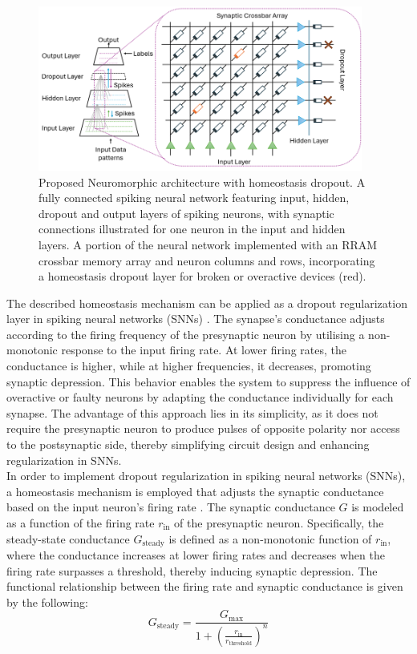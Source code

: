 \begin{figure}[!t]
    \centerline{\includegraphics[width=0.95\textwidth]{Chapter7/Figs/a.png}}
    \caption[Proposed Neuromorphic architecture with homeostasis dropout]{Proposed Neuromorphic architecture with homeostasis dropout. A fully connected spiking neural network featuring input, hidden, dropout and output layers of spiking neurons, with synaptic connections illustrated for one neuron in the input and hidden layers. A portion of the neural network implemented with an RRAM crossbar memory array and neuron columns and rows, incorporating a homeostasis dropout layer for broken or overactive devices (red).}
    \label{fig:7a}
\end{figure}
    

\noindent The described homeostasis mechanism can be applied as a dropout regularization layer in spiking neural networks (SNNs) \cite{stoffel2024spiking}. The synapse's conductance adjusts according to the firing frequency of the presynaptic neuron by utilising a non-monotonic response to the input firing rate. At lower firing rates, the conductance is higher, while at higher frequencies, it decreases, promoting synaptic depression. This behavior enables the system to suppress the influence of overactive or faulty neurons by adapting the conductance individually for each synapse. The advantage of this approach lies in its simplicity, as it does not require the presynaptic neuron to produce pulses of opposite polarity nor access to the postsynaptic side, thereby simplifying circuit design and enhancing regularization in SNNs. \\

\noindent In order to implement dropout regularization in spiking neural networks (SNNs), a homeostasis mechanism is employed that adjusts the synaptic conductance based on the input neuron’s firing rate \cite{kim2021spiking}. The synaptic conductance \( G \) is modeled as a function of the firing rate \( r_{\text{in}} \) of the presynaptic neuron. Specifically, the steady-state conductance \( G_{\text{steady}} \) is defined as a non-monotonic function of \( r_{\text{in}} \), where the conductance increases at lower firing rates and decreases when the firing rate surpasses a threshold, thereby inducing synaptic depression. The functional relationship between the firing rate and synaptic conductance is given by the following:
\begin{equation}
G_{\text{steady}} = \frac{G_{\text{max}}}{1 + \left(\frac{r_{\text{in}}}{r_{\text{threshold}}}\right)^n} \label{eq:7.1}
\end{equation}


